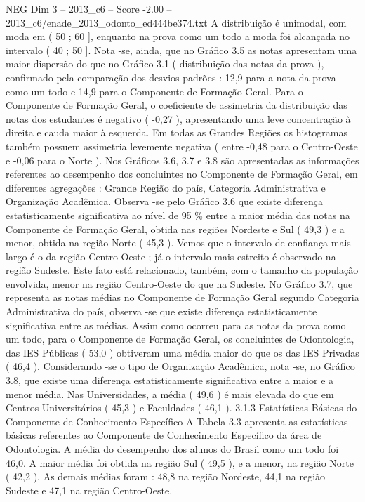 \begin{textsample}{NEG Dim 3 – 2013\_c6 – Score -2.00 – 2013\_c6/enade\_2013\_odonto\_ed444be374.txt}
A distribuição é unimodal, com moda em ( 50 ; 60 ], enquanto na prova como um todo a moda foi alcançada no intervalo ( 40 ; 50 ].
Nota -se, ainda, que no Gráfico 3.5 as notas apresentam uma maior dispersão do que no Gráfico 3.1 ( distribuição das notas da prova ), confirmado pela comparação dos desvios padrões : 12,9 para a nota da prova como um todo e 14,9 para o Componente de Formação Geral.
Para o Componente de Formação Geral, o coeficiente de assimetria da distribuição das notas dos estudantes é negativo ( -0,27 ), apresentando uma leve concentração à direita e cauda maior à esquerda.
Em todas as Grandes Regiões os histogramas também possuem assimetria levemente negativa ( entre -0,48 para o Centro-Oeste e -0,06 para o Norte ).
Nos Gráficos 3.6, 3.7 e 3.8 são apresentadas as informações referentes ao desempenho dos concluintes no Componente de Formação Geral, em diferentes agregações : Grande Região do país, Categoria Administrativa e Organização Acadêmica.
Observa -se pelo Gráfico 3.6 que existe diferença estatisticamente significativa ao nível de 95 \% entre a maior média das notas na Componente de Formação Geral, obtida nas regiões Nordeste e Sul ( 49,3 ) e a menor, obtida na região Norte ( 45,3 ).
Vemos que o intervalo de confiança mais largo é o da região Centro-Oeste ; já o intervalo mais estreito é observado na região Sudeste.
Este fato está relacionado, também, com o tamanho da população envolvida, menor na região Centro-Oeste do que na Sudeste.
No Gráfico 3.7, que representa as notas médias no Componente de Formação Geral segundo Categoria Administrativa do país, observa -se que existe diferença estatisticamente significativa entre as médias.
Assim como ocorreu para as notas da prova como um todo, para o Componente de Formação Geral, os concluintes de Odontologia, das IES Públicas ( 53,0 ) obtiveram uma média maior do que os das IES Privadas ( 46,4 ).
Considerando -se o tipo de Organização Acadêmica, nota -se, no Gráfico 3.8, que existe uma diferença estatisticamente significativa entre a maior e a menor média.
Nas Universidades, a média ( 49,6 ) é mais elevada do que em Centros Universitários ( 45,3 ) e Faculdades ( 46,1 ). 3.1.3 Estatísticas Básicas do Componente de Conhecimento Específico A Tabela 3.3 apresenta as estatísticas básicas referentes ao Componente de Conhecimento Específico da área de Odontologia.
A média do desempenho dos alunos do Brasil como um todo foi 46,0.
A maior média foi obtida na região Sul ( 49,5 ), e a menor, na região Norte ( 42,2 ).
As demais médias foram : 48,8 na região Nordeste, 44,1 na região Sudeste e 47,1 na região Centro-Oeste.

\end{textsample}
